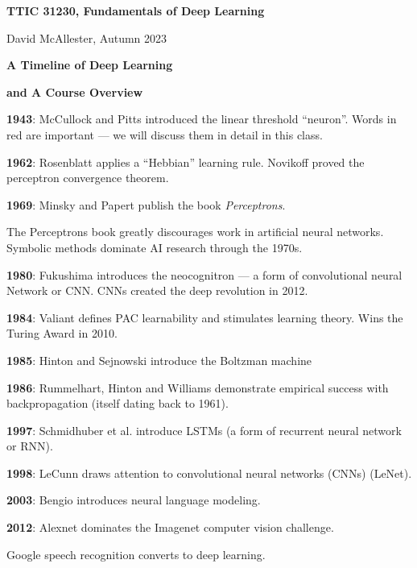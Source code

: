 




{\Huge
  \centerline{\bf TTIC 31230,  Fundamentals of Deep Learning}
  \vfill
  \centerline{David McAllester, Autumn 2023}
  \vfill
  \centerline{\bf A Timeline of Deep Learning}
  \vfill
  \centerline{\bf and A Course Overview}
\vfill
\vfill



{\bf 1943}: McCullock and Pitts introduced the {\color{red} linear threshold ``neuron''}. Words in red are important --- we will discuss them in detail in this class.

\vfill
{\bf 1962}: Rosenblatt applies a ``Hebbian'' learning rule.  Novikoff proved the perceptron convergence theorem.

\vfill
{\bf 1969}: Minsky and Papert publish the book {\it Perceptrons}.

\vfill
The Perceptrons book greatly discourages work in artificial neural networks.  Symbolic methods dominate AI research through the 1970s.


{\bf 1980}: Fukushima introduces the neocognitron --- a form of {\color{red} convolutional neural Network or CNN}.  CNNs created the deep revolution in 2012.

\vfill
{\bf 1984}: Valiant defines PAC learnability and stimulates learning theory. Wins the Turing Award in 2010.

\vfill
{\bf 1985}: Hinton and Sejnowski introduce the Boltzman machine

\vfill
{\bf 1986}: Rummelhart, Hinton and Williams demonstrate empirical success with {\color{red} backpropagation} (itself dating back to 1961).


{\bf 1997}: Schmidhuber et al. introduce LSTMs (a form of {\color{red} recurrent neural network or RNN}).

\vfill
{\bf 1998}: LeCunn draws attention to convolutional neural networks (CNNs) (LeNet).

\vfill
{\bf 2003}: Bengio introduces {\color{red} neural language modeling}.


{\bf 2012}: Alexnet dominates the Imagenet computer vision challenge.

\vfill
Google speech recognition converts to deep learning.

}
